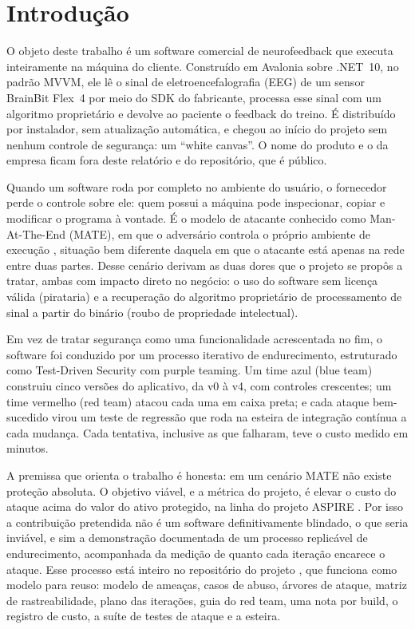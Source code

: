 \section{Introdução}
\label{sec:introducao}

O objeto deste trabalho é um software comercial de neurofeedback que executa inteiramente na máquina do cliente. Construído em Avalonia sobre .NET~10, no padrão MVVM, ele lê o sinal de eletroencefalografia (EEG) de um sensor BrainBit Flex~4 por meio do SDK do fabricante, processa esse sinal com um algoritmo proprietário e devolve ao paciente o feedback do treino. É distribuído por instalador, sem atualização automática, e chegou ao início do projeto sem nenhum controle de segurança: um \enquote{white canvas}. O nome do produto e o da empresa ficam fora deste relatório e do repositório, que é público.

Quando um software roda por completo no ambiente do usuário, o fornecedor perde o controle sobre ele: quem possui a máquina pode inspecionar, copiar e modificar o programa à vontade. É o modelo de atacante conhecido como Man-At-The-End (MATE), em que o adversário controla o próprio ambiente de execução \parencite{collberg2009}, situação bem diferente daquela em que o atacante está apenas na rede entre duas partes. Desse cenário derivam as duas dores que o projeto se propôs a tratar, ambas com impacto direto no negócio: o uso do software sem licença válida (pirataria) e a recuperação do algoritmo proprietário de processamento de sinal a partir do binário (roubo de propriedade intelectual).

Em vez de tratar segurança como uma funcionalidade acrescentada no fim, o software foi conduzido por um processo iterativo de endurecimento, estruturado como Test-Driven Security \parencite{vehent2018} com purple teaming. Um time azul (blue team) construiu cinco versões do aplicativo, da v0 à v4, com controles crescentes; um time vermelho (red team) atacou cada uma em caixa preta; e cada ataque bem-sucedido virou um teste de regressão que roda na esteira de integração contínua a cada mudança. Cada tentativa, inclusive as que falharam, teve o custo medido em minutos.

A premissa que orienta o trabalho é honesta: em um cenário MATE não existe proteção absoluta. O objetivo viável, e a métrica do projeto, é elevar o custo do ataque acima do valor do ativo protegido, na linha do projeto ASPIRE \parencite{aspire}. Por isso a contribuição pretendida não é um software definitivamente blindado, o que seria inviável, e sim a demonstração documentada de um processo replicável de endurecimento, acompanhada da medição de quanto cada iteração encarece o ataque. Esse processo está inteiro no repositório do projeto \parencite{repo}, que funciona como modelo para reuso: modelo de ameaças, casos de abuso, árvores de ataque, matriz de rastreabilidade, plano das iterações, guia do red team, uma nota por build, o registro de custo, a suíte de testes de ataque e a esteira.


